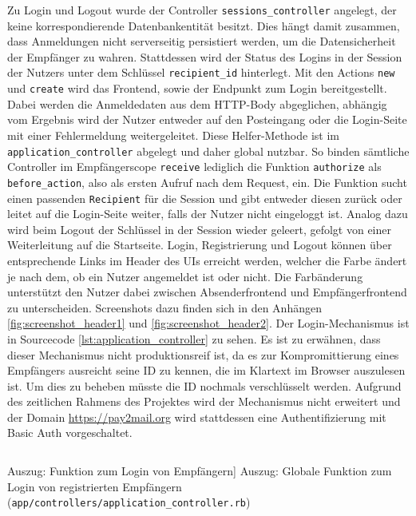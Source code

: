 \noindent Zu Login und Logout wurde der Controller \texttt{sessions\_controller} angelegt, der keine korrespondierende Datenbankentität besitzt. Dies hängt damit zusammen, dass Anmeldungen nicht serverseitig persistiert werden, um die Datensicherheit der Empfänger zu wahren. Stattdessen wird der Status des Logins in der Session der Nutzers unter dem Schlüssel \texttt{recipient\_id} hinterlegt. Mit den Actions \texttt{new} und \texttt{create} wird das Frontend, sowie der Endpunkt zum Login bereitgestellt. Dabei werden die Anmeldedaten aus dem HTTP-Body abgeglichen, abhängig vom Ergebnis wird der Nutzer entweder auf den Posteingang oder die Login-Seite mit einer Fehlermeldung weitergeleitet. Diese Helfer-Methode ist im \texttt{application\_controller} abgelegt und daher global nutzbar. So binden sämtliche Controller im Empfängerscope \texttt{receive} lediglich die Funktion \texttt{authorize} als \texttt{before\_action}, also als ersten Aufruf nach dem Request, ein. Die Funktion sucht einen passenden \texttt{Recipient} für die Session und gibt entweder diesen zurück oder leitet auf die Login-Seite weiter, falls der Nutzer nicht eingeloggt ist. Analog dazu wird beim Logout der Schlüssel in der Session wieder geleert, gefolgt von einer Weiterleitung auf die Startseite. Login, Registrierung und Logout können über entsprechende Links im Header des UIs erreicht werden, welcher die Farbe ändert je nach dem, ob ein Nutzer angemeldet ist oder nicht. Die Farbänderung unterstützt den Nutzer dabei zwischen Absenderfrontend und Empfängerfrontend zu unterscheiden. Screenshots dazu finden sich in den Anhängen \ref{fig:screenshot_header1} und \ref{fig:screenshot_header2}. Der Login-Mechanismus ist in Sourcecode \ref{lst:application_controller} zu sehen. Es ist zu erwähnen, dass dieser Mechanismus nicht produktionsreif ist, da es zur Kompromittierung eines Empfängers ausreicht seine ID zu kennen, die im Klartext im Browser auszulesen ist. Um dies zu beheben müsste die ID nochmals verschlüsselt werden. Aufgrund des zeitlichen Rahmens des Projektes wird der Mechanismus nicht erweitert und der Domain \url{https://pay2mail.org} wird stattdessen eine Authentifizierung mit Basic Auth vorgeschaltet.

\begin{listing}[!ht]
\inputminted[linenos]{ruby}{Listings/Pkg3/application_controller.rb}

\caption
    [Auszug: Funktion zum Login von Empfängern]
    {Auszug: Globale Funktion zum Login von registrierten Empfängern (\texttt{app/controllers/application\_controller.rb})}

\label{lst:application_controller}
\end{listing}

